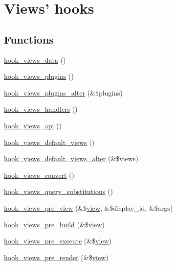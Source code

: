 \hypertarget{group__views__hooks}{
\section{Views' hooks}
\label{group__views__hooks}
}
\subsection*{Functions}
\begin{CompactItemize}
\item 
\hyperlink{group__views__hooks_g227057901681e4a33e33c199c7a8c989}{hook\_\-views\_\-data} ()
\item 
\hyperlink{group__views__hooks_g23f6e9972b2ed84fc54b7ff63f44477d}{hook\_\-views\_\-plugins} ()
\item 
\hyperlink{group__views__hooks_g6c4e4c2a769b0017bf0edcd0adae57e9}{hook\_\-views\_\-plugins\_\-alter} (\&\$plugins)
\item 
\hyperlink{group__views__hooks_gbf506f44bd8d8a86876f27396f5341ed}{hook\_\-views\_\-handlers} ()
\item 
\hyperlink{group__views__hooks_gc67ffd4a2f61f9814ee37b541c472c47}{hook\_\-views\_\-api} ()
\item 
\hyperlink{group__views__hooks_g23edb74860682fa88f75cf94b97c2e15}{hook\_\-views\_\-default\_\-views} ()
\item 
\hyperlink{group__views__hooks_gcd31035a6ae9c7baf05ad034d6a65768}{hook\_\-views\_\-default\_\-views\_\-alter} (\&\$views)
\item 
\hyperlink{group__views__hooks_ge98b0a1c700fe1406af390dfc8c7262e}{hook\_\-views\_\-convert} ()
\item 
\hyperlink{group__views__hooks_g2a2f60cadfec300b51a4960080ef8ac5}{hook\_\-views\_\-query\_\-substitutions} ()
\item 
\hyperlink{group__views__hooks_g471b90caa886a4e4239a839d6bf7a963}{hook\_\-views\_\-pre\_\-view} (\&\$\hyperlink{classview}{view}, \&\$display\_\-id, \&\$args)
\item 
\hyperlink{group__views__hooks_g1c3fc52e2854310f84eeb43b98a0ba64}{hook\_\-views\_\-pre\_\-build} (\&\$\hyperlink{classview}{view})
\item 
\hyperlink{group__views__hooks_gf7582b210bdd367d6006c7dc62304475}{hook\_\-views\_\-pre\_\-execute} (\&\$\hyperlink{classview}{view})
\item 
\hyperlink{group__views__hooks_gb88d5c49ec4ad30dba2be34327d5b0cc}{hook\_\-views\_\-pre\_\-render} (\&\$\hyperlink{classview}{view})

\end{CompactItemize}
